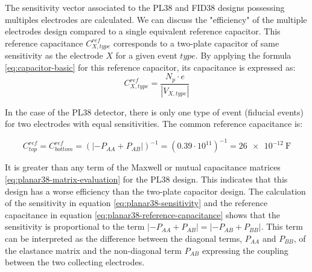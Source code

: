 
The sensitivity vector associated to the PL38 and FID38 designs possessing multiples electrodes are calculated. We can discuss the "efficiency" of the multiple electrodes design compared to a single equivalent reference capacitor. This reference capacitance $C_{X, type}^{ref}$ corresponds to a two-plate capacitor of same sensitivity as the electrode $X$ for a given event $type$. By applying the formula \ref{eq:capacitor-basic} for this reference capacitor, its capacitance is expressed as:
\begin{equation}
C_{X,type}^{ref} = \frac{N_p \cdot e}{| V_{X,type} |}
\end{equation}

%

In the case of the PL38 detector, there is only one type of event (fiducial events) for two electrodes with equal sensitivities. The common reference capacitance is:

\begin{equation}
\label{eq:planar38-reference-capacitance}
C_{top}^{ref}
= C_{bottom}^{ref}
= \left( | -P_{AA} + P_{AB} |\right)^{-1}
= (0.39 \cdot 10^{11})^{-1}
= \SI{26e-12}{\farad}
\end{equation}

It is greater than any term of the Maxwell or mutual capacitance matrices \ref{eq:planar38-matrix-evaluation} for the PL38 design. This indicates that this design has a worse efficiency than the two-plate capacitor design. The calculation of the sensitivity in equation \ref{eq:planar38-sensitivity} and the reference capacitance in equation \ref{eq:planar38-reference-capacitance} shows that the sensitivity is proportional to the term $| -P_{AA} + P_{AB} | = | -P_{AB} + P_{BB} |$. This term can be interpreted as the difference between the diagonal terms, $P_{AA}$ and $P_{BB}$, of the elastance matrix and the non-diagonal term $P_{AB}$ expressing the coupling between the two collecting electrodes.

